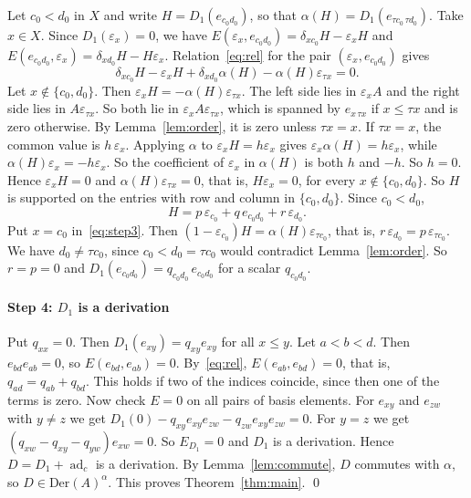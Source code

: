 \documentclass[]{interact}
\theoremstyle{plain}
\theoremstyle{definition}
\theoremstyle{remark}
\newcommand{\Der}{\mathrm{Der}}
\begin{document}
Let $c_0 < d_0$ in $X$ and write $H = D_1(e_{c_0 d_0})$, so that $\alpha(H) = D_1(e_{\tau c_0\,\tau d_0})$.
Take $x \in X$.
Since $D_1(\varepsilon_x) = 0$, we have $E(\varepsilon_x, e_{c_0d_0}) = \delta_{xc_0}H - \varepsilon_xH$ and $E(e_{c_0d_0}, \varepsilon_x) = \delta_{xd_0}H - H\varepsilon_x$.
Relation~\eqref{eq:rel} for the pair $(\varepsilon_x, e_{c_0d_0})$ gives
\begin{equation}\label{eq:step3}
\delta_{xc_0}H - \varepsilon_xH + \delta_{xd_0}\alpha(H) - \alpha(H)\varepsilon_{\tau x} = 0.
\end{equation}
Let $x \notin \{c_0,d_0\}$.
Then $\varepsilon_xH = -\alpha(H)\varepsilon_{\tau x}$.
The left side lies in $\varepsilon_xA$ and the right side lies in $A\varepsilon_{\tau x}$. %
So both lie in $\varepsilon_xA\varepsilon_{\tau x}$, which is spanned by $e_{x\,\tau x}$ if $x \le \tau x$ and is zero otherwise.
By Lemma~\ref{lem:order}, it is zero unless $\tau x = x$.
If $\tau x = x$, the common value is $h\,\varepsilon_x$.
Applying $\alpha$ to $\varepsilon_xH = h\varepsilon_x$ gives $\varepsilon_x\alpha(H) = h\varepsilon_x$, while $\alpha(H)\varepsilon_x = -h\varepsilon_x$.
So the coefficient of $\varepsilon_x$ in $\alpha(H)$ is both $h$ and $-h$. %
So $h = 0$.
Hence $\varepsilon_xH = 0$ and $\alpha(H)\varepsilon_{\tau x} = 0$, that is, $H\varepsilon_x = 0$, for every $x \notin \{c_0,d_0\}$.
So $H$ is supported on the entries with row and column in $\{c_0,d_0\}$.
Since $c_0 < d_0$,
\[
H = p\,\varepsilon_{c_0} + q\,e_{c_0d_0} + r\,\varepsilon_{d_0}.
\]
Put $x = c_0$ in~\eqref{eq:step3}.
Then $(1-\varepsilon_{c_0})H = \alpha(H)\varepsilon_{\tau c_0}$, that is, $r\,\varepsilon_{d_0} = p\,\varepsilon_{\tau c_0}$.
We have $d_0 \ne \tau c_0$, since $c_0 < d_0 = \tau c_0$ would contradict Lemma~\ref{lem:order}.
So $r = p = 0$ and $D_1(e_{c_0d_0}) = q_{c_0d_0}\,e_{c_0d_0}$ for a scalar $q_{c_0d_0}$.

\paragraph*{Step 4: $D_1$ is a derivation}

Put $q_{xx} = 0$.
Then $D_1(e_{xy}) = q_{xy}e_{xy}$ for all $x \le y$.
Let $a < b < d$.
Then $e_{bd}e_{ab} = 0$, so $E(e_{bd}, e_{ab}) = 0$.
By~\eqref{eq:rel}, $E(e_{ab},e_{bd}) = 0$, that is, $q_{ad} = q_{ab} + q_{bd}$.
This holds if two of the indices coincide, since then one of the terms is zero.
Now check $E = 0$ on all pairs of basis elements.
For $e_{xy}$ and $e_{zw}$ with $y \ne z$ we get $D_1(0) - q_{xy}e_{xy}e_{zw} - q_{zw}e_{xy}e_{zw} = 0$.
For $y = z$ we get $(q_{xw} - q_{xy} - q_{yw})e_{xw} = 0$.
So $E_{D_1} = 0$ and $D_1$ is a derivation.
Hence $D = D_1 + \operatorname{ad}_c$ is a derivation.
By Lemma~\ref{lem:commute}, $D$ commutes with $\alpha$, so $D \in \Der(A)^\alpha$.
This proves Theorem~\ref{thm:main}. \qed
\end{document}

